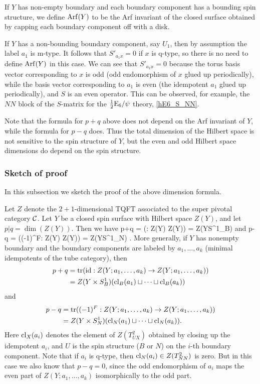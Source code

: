 If $Y$ has non-empty boundary and each boundary component has a bounding spin structure, 
we define $\operatorname{Arf}(Y)$ to be the Arf invariant of the closed 
surface obtained by capping each boundary component off with a disk.

If $Y$ has a non-bounding boundary component, say $U_1$, then by assumption
the label $a_1$ is m-type.
It follows that $S'_{a_1 x} = 0$ if $x$ is q-type, so there is no need to define $\operatorname{Arf}(Y)$ in this case.
We can see that $S'_{a_1 x} = 0$
because the torus basis vector corresponding to $x$ is odd (odd endomorphism of $x$
glued up periodically), while the basis vector corresponding to $a_1$ is even (the idempotent $a_1$
glued up periodically), and $S$ is an even operator.
This can be observed, for example, the $NN$ block of the $S$-matrix
for the $\frac{1}{2}\text{E}_6/\psi$ theory, \eqref{hE6_S_NN}.

Note that the formula for $p+q$ above does not depend on the Arf invariant of $Y$, while the formula for $p-q$ does.
Thus the total dimension of the Hilbert space is not sensitive to the spin structure
of $Y$, but the even and odd Hilbert space dimensions do depend on the spin structure.



\subsubsection{Sketch of proof}

In this subsection we sketch the proof of the above dimension formula.

\newcommand{\ztt}{Z}
\newcommand{\zob}{Z_{S^1_B}}
\newcommand{\zon}{Z_{S^1_N}}


Let $\ztt$ denote the $2{+}1$-dimensional TQFT associated to the super pivotal category $\mathcal{C}$.
Let $Y$ be a closed spin surface with Hilbert space $\ztt(Y)$, and let $p|q = \dim(\ztt(Y))$.
Then we have
\be  \label{df1}
	p+q = \tr(\id: \ztt(Y) \to \ztt(Y)) = \ztt(Y\times S^1_B)
\ee
and
\be  \label{df2}
	p-q = \tr((-1)^F: \ztt(Y) \to \ztt(Y)) = \ztt(Y\times S^1_N) .
\ee
More generally, if $Y$ has nonempty boundary and the boundary components are labeled by $a_1,\ldots,a_k$ 
(minimal idempotents of the tube category), then
\begin{align}  \label{df3}
	p+q & = \tr(\id: \ztt(Y; a_1,\ldots,a_k) \to \ztt(Y; a_1,\ldots,a_k)) \\
		& = \ztt(Y\times S^1_B)(\cl_B(a_1)\du\cdots\du \cl_B(a_k))
\end{align}
and
\begin{align}  \label{df4}
	p-q & = \tr((-1)^F:  \ztt(Y; a_1,\ldots,a_k) \to \ztt(Y; a_1,\ldots,a_k)) \\
		& = \ztt(Y\times S^1_N)(\cl_N(a_1)\du\cdots\du \cl_N(a_k)) .
\end{align}
Here $\text{cl}_X(a_i)$ denotes the element of $\ztt(T^2_{UX})$ obtained by closing up the idempotent $a_i$,
and $U$ is the spin structure ($B$ or $N$) on the $i$-th boundary component.
Note that if $a_i$ is q-type, then $\cl_N(a_i) \in \ztt(T^2_{NN})$ is zero.
But in this case we also know that $p-q = 0$, since the odd endomorphism of $a_i$ maps the even part of 
$\ztt(Y; a_1,\ldots,a_k)$ isomorphically to the odd part.

